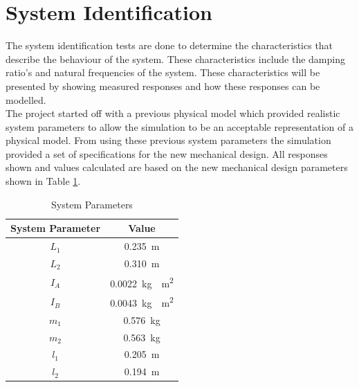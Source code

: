 \section{System Identification}
\label{sec:system_identification}

The system identification tests are done to determine the characteristics that describe the behaviour of the system. These characteristics include the damping ratio's and natural frequencies of the system. These characteristics will be presented by showing measured responses and how these responses can be modelled. \\

The project started off with a previous physical model which provided realistic system parameters to allow the simulation to be an acceptable representation of a physical model. From using these previous system parameters the simulation provided a set of specifications for the new mechanical design. All responses shown and values calculated are based on the new mechanical design parameters shown in Table \ref{table:system_param}.\\


		\begin{table}[]
	\centering
	\begin{tabular}{|c|c|}
		\hline
		System Parameter & Value \\
		\hline
		\hline
		$L_{1}$ & \SI{0.235}{m} \\
		\hline
		$L_{2}$ & \SI{0.310}{m} \\ 
		\hline
		$I_{A}$ & \SI{ 0.0022}{kg\cdot m^2}\\
		\hline
		$I_{B}$ & \SI{0.0043}{kg\cdot m^2}\\
		\hline
		$m_{1}$ & \SI{0.576}{kg}\\
		\hline
		$m_{2}$ & \SI{0.563}{kg} \\
		\hline
		$l_{1}$ & \SI{0.205}{m}\\
		\hline
		$l_{2}$ & \SI{0.194}{m}\\
		\hline
	\end{tabular}
	\caption{System Parameters}
	\label{table:system_param}
\end{table}


